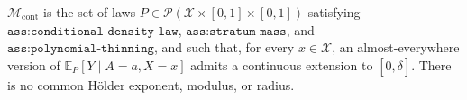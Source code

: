 \(\mathcal M_{\mathrm{cont}}\) is the set of laws \(P\in\mathcal P(\mathcal X\times[0,1]\times[0,1])\) satisfying \(\texttt{ass:conditional-density-law}\), \(\texttt{ass:stratum-mass}\), and \(\texttt{ass:polynomial-thinning}\), and such that, for every \(x\in\mathcal X\), an almost-everywhere version of \(\mathbb E_P[Y\mid A=a,X=x]\) admits a continuous extension to \([0,\bar\delta]\).  There is no common Hölder exponent, modulus, or radius.